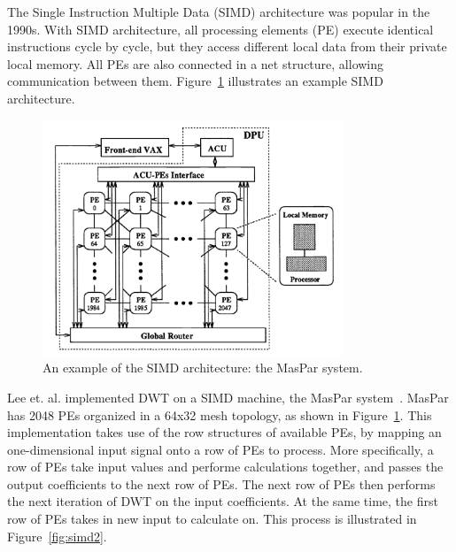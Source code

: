 The Single Instruction Multiple Data (SIMD) architecture was popular in the
1990s.
%
With SIMD architecture, all processing elements (PE) execute identical instructions
cycle by cycle, but they access different local data from their private 
local memory.
%
All PEs are also connected in a net structure, allowing
communication between them.
%
Figure~\ref{fig:simd1} illustrates an example SIMD architecture.

\begin{figure}
    \centering
    \includegraphics[width=0.8\textwidth]{fig/simd.png}
    \caption{An example of the SIMD architecture: the MasPar system.}
    \label{fig:simd1}
\end{figure}


Lee et. al. implemented DWT on a SIMD machine, the MasPar
system~\cite{lee1994parallel}.
%
MasPar has 2048 PEs organized in a 64x32
mesh topology, as shown in Figure~\ref{fig:simd1}.
%
This implementation takes use of the row structures of available PEs,
by mapping an one-dimensional input signal onto a row of PEs to process.
%
More specifically, a row of PEs take input values and performe calculations 
together, and passes the output coefficients to the next row of PEs.
%
The next row of PEs then performs the next iteration of DWT on the input
coefficients.
%
At the same time, the first row of PEs takes in new input to calculate on.
%
This process is illustrated in Figure~\ref{fig:simd2}.


